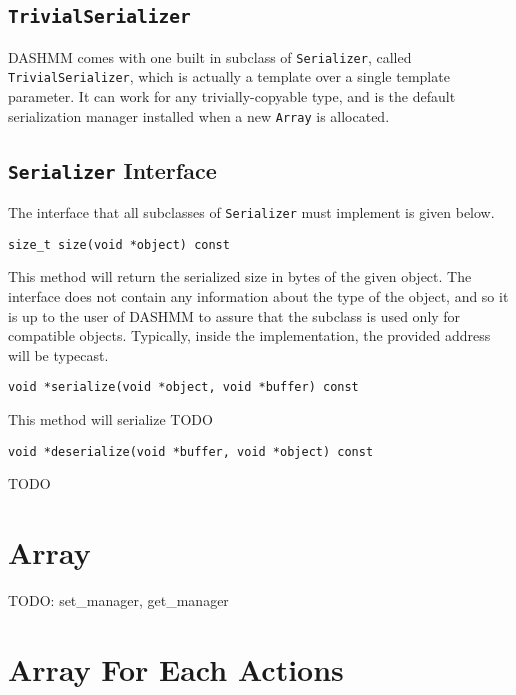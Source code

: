 \subsection{\texttt{TrivialSerializer}}

DASHMM comes with one built in subclass of \texttt{Serializer}, called
\texttt{TrivialSerializer}, which is actually a template over a single
template parameter. It can work for any trivially-copyable type, and is the
default serialization manager installed when a new \texttt{Array} is
allocated.

\subsection{\texttt{Serializer} Interface}

The interface that all subclasses of \texttt{Serializer} must implement is
given below.

\begin{lstlisting}
size_t size(void *object) const
\end{lstlisting}

\noindent This method will return the serialized size in bytes of the given
object. The interface does not contain any information about the type of the
object, and so it is up to the user of DASHMM to assure that the subclass is
used only for compatible objects. Typically, inside the implementation, the
provided address will be typecast.

\begin{lstlisting}
void *serialize(void *object, void *buffer) const
\end{lstlisting}

\noindent This method will serialize TODO

\begin{lstlisting}
void *deserialize(void *buffer, void *object) const
\end{lstlisting}

\noindent TODO

\section{Array}

TODO: set_manager, get_manager


\section{Array For Each Actions}

